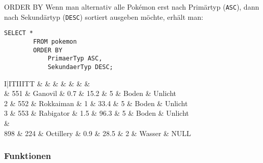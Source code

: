 \begin{sql}{ORDER BY}
    Wenn man alternativ alle Pokémon erst nach Primärtyp (\texttt{ASC}), dann nach Sekundärtyp (\texttt{DESC}) sortiert ausgeben möchte, erhält man:

    \begin{lstlisting}[language=mysql]
        SELECT *
        FROM pokemon
        ORDER BY
            PrimaerTyp ASC,
            SekundaerTyp DESC;
    \end{lstlisting}

    \setcounter{rownum}{0}
    \begin{tabular}{I|ITIIITT}
                                   &     &  &  &  &  &  &  \\                          & 551                       & Ganovil                  & 0.7                         & 15.2                        & 5                              & Boden                          & Unlicht                          \\
        2                          & 552                       & Rokkaiman                & 1                           & 33.4                        & 5                              & Boden                          & Unlicht                          \\
        3                          & 553                       & Rabigator                & 1.5                         & 96.3                        & 5                              & Boden                          & Unlicht                          \\
         &                                                                                                                                                                                              \\
        898                        & 224                       & Octillery                & 0.9                         & 28.5                        & 2                              & Wasser                         & NULL                             \\
    \end{tabular}
\end{sql}

\subsubsection{Funktionen}


